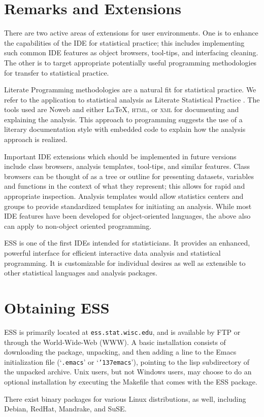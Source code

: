 \documentclass{article}
\newcommand{\stexttt}[1]{{\small\texttt{#1}}}
\newcommand{\US}{{\char'137}}        %
\newcommand{\file}[1]{`\stexttt{#1}'}
\begin{document}
\section{Remarks and Extensions}
\label{sec:remarks}

There are two active areas of extensions for user environments.  One
is to enhance the capabilities of the IDE for statistical practice;
this includes implementing such common IDE features as object
browsers, tool-tips, and interfacing cleaning.  The other is to
target appropriate potentially useful programming methodologies for
transfer to statistical practice.

Literate Programming methodologies \citep{Knuth:1992,NRamsey:1994} are
a natural fit for statistical practice.  We refer to the application
to statistical analysis as Literate Statistical Practice
\citep{rossini:dsc:2001}.  The tools used are Noweb
\citep{NRamsey:1994} and either \LaTeX, \textsc{html}, or \textsc{xml}
for documenting and explaining the analysis.  This approach to
programming suggests the use of a literary documentation style with
embedded code to explain how the analysis approach is realized.

Important IDE extensions which should be implemented in future
versions include class browsers, analysis templates, tool-tips, and
similar features.  Class browsers can be thought of as a tree or
outline for presenting datasets, variables and functions in the
context of what they represent; this allows for rapid and appropriate
inspection.  Analysis templates would allow statistics centers and
groups to provide standardized templates for initiating an analysis.
While most IDE features have been developed for object-oriented
languages, the above also can apply to non-object oriented
programming.

ESS is one of the first IDEs intended for statisticians.  It provides
an enhanced, powerful interface for efficient interactive data
analysis and statistical programming.  It is customizable for
individual desires as well as extensible to other statistical
languages and analysis packages.

\singlespace



\appendix
\section{Obtaining ESS}
\label{sec:getIt}

ESS \citep{ESS} is primarily located at \stexttt{ess.stat.wisc.edu},
and is available by FTP or through the World-Wide-Web (WWW).  A basic
installation consists of downloading the package, unpacking, and then
adding a line to the Emacs initialization file (\file{.emacs} or
\file{\US emacs}), pointing to the lisp subdirectory of the unpacked
archive.  Unix users, but not Windows users, may choose to do an
optional installation by executing the Makefile that comes with the
ESS package.

There exist binary packages for various Linux distributions, as well,
including Debian, RedHat, Mandrake, and SuSE.
\end{document}
